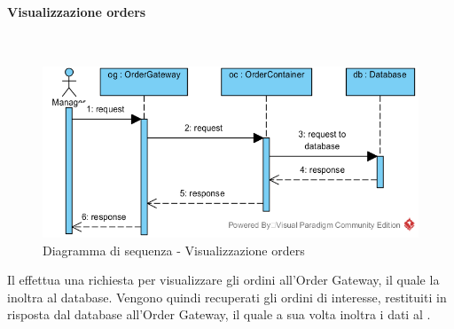 \begin{samepage}
\paragraph{Visualizzazione orders}\mbox{}\\
\end{samepage}
\begin{figure}[H]
	\centering
	\includegraphics[width=15cm]{../../documenti/SpecificaTecnica/diagrammi_img/sequenza/direttore_visualizza_orders.png}
	\caption{Diagramma di sequenza - Visualizzazione orders}
\end{figure}
Il \Manager{} effettua una richiesta per visualizzare gli ordini all'Order Gateway, il quale la inoltra al database. Vengono quindi recuperati gli ordini di interesse, restituiti in risposta dal database all'Order Gateway, il quale a sua volta inoltra i dati al \Manager{}.